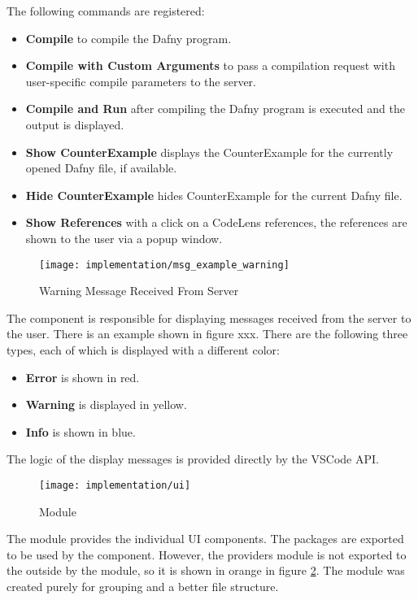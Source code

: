 The following commands are registered:
\begin{itemize}
    \item {\bf Compile} \textendash{} to compile the Dafny program.
    \item {\bf Compile with Custom Arguments} \textendash{} to pass a compilation request with user-specific
    compile parameters to the server.
    \item {\bf Compile and Run} \textendash{} after compiling the Dafny program is executed and the output is displayed.
    \item {\bf Show CounterExample} \textendash{} displays the CounterExample for the currently opened Dafny file, if available.
    \item {\bf Hide CounterExample} \textendash{} hides CounterExample for the current Dafny file.
    \item {\bf Show References} \textendash{} with a click on a CodeLens references,
    the references are shown to the user via a popup window.
\end{itemize}

\begin{figure}[H]
    \centering
    \texttt{[image: implementation/msg\_example\_warning]}
    \caption{Warning Message Received From Server}
    \label{fig:msg_example}
\end{figure}

The  component is responsible for displaying messages received from the server to the user.
There is an example shown in figure xxx.
There are the following three types, each of which is displayed with a different color:

\begin{itemize}
    \item {\bf Error} \textendash{} is shown in red.
    \item {\bf Warning} \textendash{} is displayed in yellow.
    \item {\bf Info} \textendash{} is shown in blue.
\end{itemize}

The logic of the display messages is provided directly by the VSCode API.

\begin{figure}[H]
    \centering
    \texttt{[image: implementation/ui]}
    \caption{Module }
    \label{fig:ui_module}
\end{figure}

The  module provides the individual UI components.
The packages are exported to be used by the  component.
However, the providers module is not exported to the outside by the  module,
so it is shown in orange in figure \ref{fig:ui_module}.
The module was created purely for grouping and a better file structure.\\

